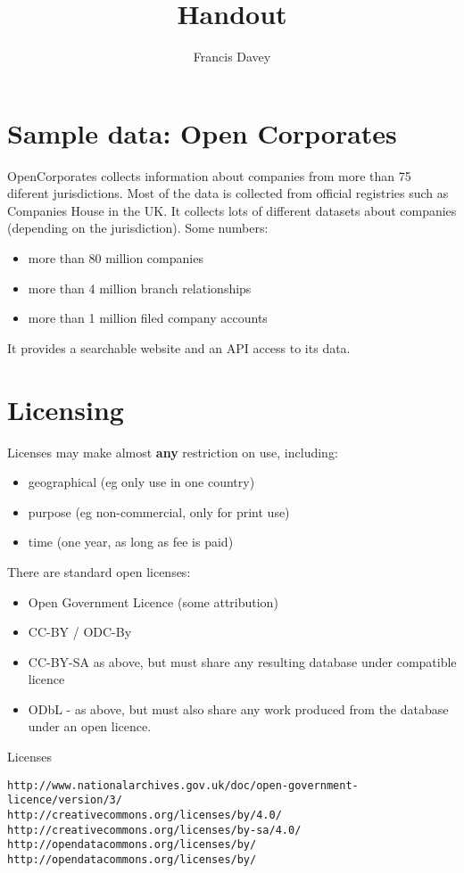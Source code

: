 \documentclass[12pt, a4paper]{article}
\title{Handout}
\author{Francis Davey}
\date{}
\begin{document}
\raggedright

\section*{Sample data: Open Corporates}
OpenCorporates collects information about companies from more than 75 diferent jurisdictions. Most of the data is collected from official registries such as Companies House in the UK. It collects lots of different datasets about companies (depending on the jurisdiction). Some numbers:

\begin{itemize}
\item more than 80 million companies
\item more than 4 million branch relationships
\item more than 1 million filed company accounts
\end{itemize}

It provides a searchable website and an API access to its data.

\section*{Licensing}

Licenses may make almost {\bf any} restriction on use, including:
\begin{itemize}
\item geographical (eg only use in one country)
\item purpose (eg non-commercial, only for print use)
\item time (one year, as long as fee is paid)
\end{itemize}

There are standard open licenses:
\begin{itemize}
\item Open Government Licence (some attribution)
\item CC-BY / ODC-By
\item CC-BY-SA as above, but must share any resulting database under compatible licence
\item ODbL - as above, but must also share any work produced from the database under an open licence.
\end{itemize}

Licenses
\begin{verbatim}
http://www.nationalarchives.gov.uk/doc/open-government-licence/version/3/
http://creativecommons.org/licenses/by/4.0/
http://creativecommons.org/licenses/by-sa/4.0/
http://opendatacommons.org/licenses/by/
http://opendatacommons.org/licenses/by/  
\end{verbatim}
\end{document}
